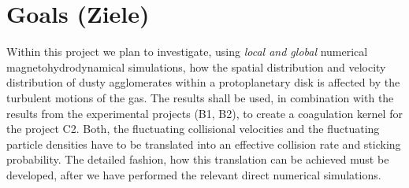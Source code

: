 \section{Goals (Ziele)}
%
Within this project we plan to investigate, using {\it local and global}
numerical magnetohydro\-dynamical simulations, how the spatial distribution
and velocity distribution of dusty agglomerates within a protoplanetary disk
is affected by the turbulent motions of the gas.  The results shall be used,
in combination with the results from the experimental projects (B1, B2), to
create a coagulation kernel for the project C2.  Both, the fluctuating
collisional velocities and the fluctuating particle densities have to be
translated into an effective collision rate and sticking probability.  The
detailed fashion, how this translation can be achieved must be developed,
after we have performed the relevant direct numerical simulations.

